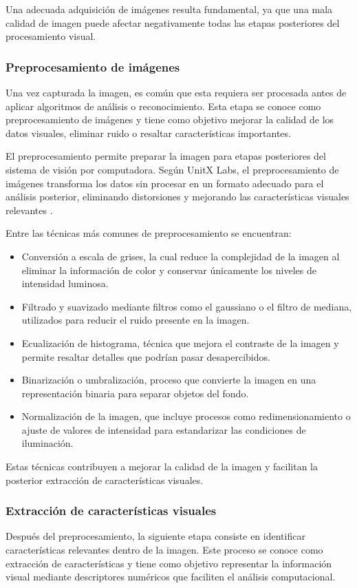 Una adecuada adquisición de imágenes resulta fundamental, ya que una mala calidad de imagen puede afectar negativamente todas las etapas posteriores del procesamiento visual.
\subsubsection{Preprocesamiento de imágenes}
Una vez capturada la imagen, es común que esta requiera ser procesada antes de aplicar algoritmos de análisis o reconocimiento. Esta etapa se conoce como preprocesamiento de imágenes y tiene como objetivo mejorar la calidad de los datos visuales, eliminar ruido o resaltar características importantes.

El preprocesamiento permite preparar la imagen para etapas posteriores del sistema de visión por computadora. Según UnitX Labs, el preprocesamiento de imágenes transforma los datos sin procesar en un formato adecuado para el análisis posterior, eliminando distorsiones y mejorando las características visuales relevantes \cite{unitxlabs_prepost}.

Entre las técnicas más comunes de preprocesamiento se encuentran:
\begin{itemize}
    \item Conversión a escala de grises, la cual reduce la complejidad de la imagen al eliminar la información de color y conservar únicamente los niveles de intensidad luminosa.
    \item Filtrado y suavizado mediante filtros como el gaussiano o el filtro de mediana, utilizados para reducir el ruido presente en la imagen.
    \item Ecualización de histograma, técnica que mejora el contraste de la imagen y permite resaltar detalles que podrían pasar desapercibidos.
    \item Binarización o umbralización, proceso que convierte la imagen en una representación binaria para separar objetos del fondo.
    \item Normalización de la imagen, que incluye procesos como redimensionamiento o ajuste de valores de intensidad para estandarizar las condiciones de iluminación.
\end{itemize}

Estas técnicas contribuyen a mejorar la calidad de la imagen y facilitan la posterior extracción de características visuales.

\subsubsection{Extracción de características visuales}
Después del preprocesamiento, la siguiente etapa consiste en identificar características relevantes dentro de la imagen. Este proceso se conoce como extracción de características y tiene como objetivo representar la información visual mediante descriptores numéricos que faciliten el análisis computacional.

